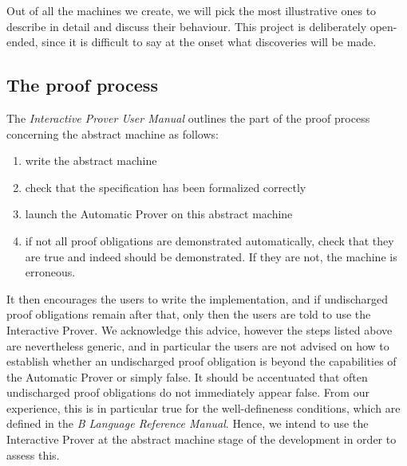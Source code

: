 \documentclass[12pt,journal,duplex]{IEEEtran}
\begin{document}
	Out of all the machines we create, we will pick the most illustrative ones to describe in detail and discuss their behaviour. This project is deliberately open-ended, since it is difficult to say at the onset what discoveries will be made.
	\subsection{The proof process}
	The \emph{Interactive Prover User Manual}\cite{Prover guide} outlines the part of the proof process concerning the abstract machine as follows:
	\begin{enumerate}
		\item write the abstract machine
		\item check that the specification has been formalized correctly
		\item launch the Automatic Prover on this abstract machine
		\item if not all proof obligations are demonstrated automatically, check that they are true and indeed should be demonstrated. If they are not, the machine is erroneous.
	\end{enumerate}

	It then encourages the users to write the implementation, and if undischarged proof obligations remain after that, only then the users are told to use the Interactive Prover. We acknowledge this advice, however the steps listed above are nevertheless generic, and in particular the users are not advised on how to establish whether an undischarged proof obligation is beyond the capabilities of the Automatic Prover or simply false. It should be accentuated that often undischarged proof obligations do not immediately appear false. From our experience, this is in particular true for the well-defineness conditions, which are defined in the \emph{B Language Reference Manual}\cite{b reference}. Hence, we intend to use the Interactive Prover at the abstract machine stage of the development in order to assess this.
\end{document}
